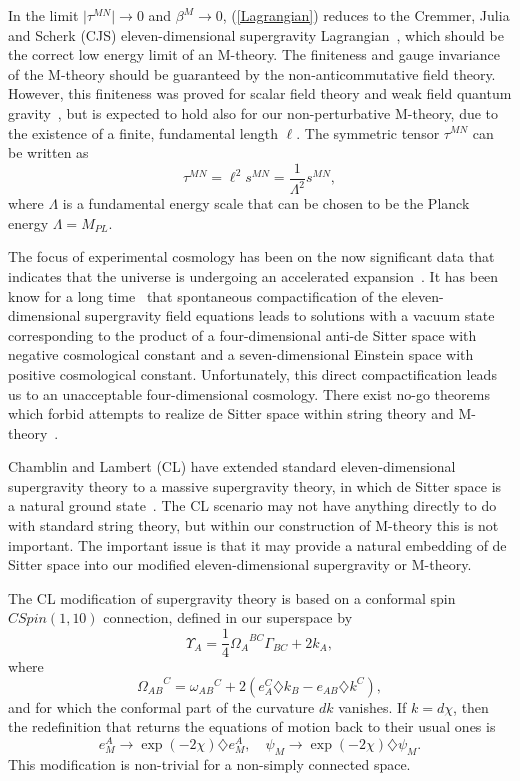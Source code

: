 \documentclass[a4paper,12pt]{article}
\begin{document}
In the limit $\vert\tau^{MN}\vert\rightarrow 0$ and
$\beta^M\rightarrow 0$, (\ref{Lagrangian}) reduces to the Cremmer, Julia
and Scherk (CJS) eleven-dimensional supergravity Lagrangian~\cite{Julia},
which should be the correct low energy limit of an M-theory. The finiteness
and gauge invariance of the M-theory should be guaranteed by the
non-anticommutative field theory. However, this finiteness was proved for
scalar field theory and weak field quantum
gravity~\cite{Moffat,Moffat2,Moffat3}, but is expected to hold also for our
non-perturbative M-theory, due to the existence of a finite, fundamental
length $\ell$. The symmetric tensor $\tau^{MN}$ can be written as
\begin{equation} \tau^{MN}=\ell^2s^{MN}=\frac{1}{\Lambda^2}s^{MN},
\end{equation} where $\Lambda$ is a fundamental energy scale that can be
chosen to be the Planck energy $\Lambda=M_{PL}$.

The focus of experimental cosmology has been on the now significant data
that indicates that the universe is undergoing an accelerated
expansion~\cite{Perlmutter}. It has been know for a long
time~\cite{Duff} that spontaneous compactification of the
eleven-dimensional supergravity field equations leads to solutions with a
vacuum state corresponding to the product of a four-dimensional anti-de
Sitter space with negative cosmological constant and a seven-dimensional
Einstein space with positive cosmological constant. Unfortunately, this
direct compactification leads us to an unacceptable four-dimensional
cosmology. There exist no-go theorems which forbid attempts to realize de
Sitter space within string theory and M-theory~\cite{Maldacena}.

Chamblin and Lambert (CL) have extended standard
eleven-dimensional supergravity theory to a massive supergravity theory, in
which de Sitter space is a natural ground state~\cite{Lambert}. The CL
scenario may not have anything directly to do with standard
string theory, but within our construction of M-theory this is not
important. The important issue is that it may provide a natural embedding
of de Sitter space into our modified eleven-dimensional supergravity or
M-theory.

The CL modification of supergravity theory is based on a conformal spin
$CSpin(1,10)$ connection, defined in our superspace by
\begin{equation}
\Upsilon_A=\frac{1}{4}{\Omega_A}^{BC}\Gamma_{BC}+2k_A,
\end{equation}
where
\begin{equation}
{\Omega_{AB}}^C={\omega_{AB}}^{C}+2(e^C_A\diamondsuit
k_B-e_{AB}\diamondsuit k^C),
\end{equation}
and for which the conformal part of
the curvature $dk$ vanishes. If $k=d\chi$, then the redefinition that
returns the equations of motion back to their usual ones is
\begin{equation}
e^A_M\rightarrow\exp(-2\chi)\diamondsuit e^A_M,\quad
\psi_M\rightarrow \exp(-2\chi)\diamondsuit\psi_M.
\end{equation} This
modification is non-trivial for a non-simply connected space.
\end{document}
